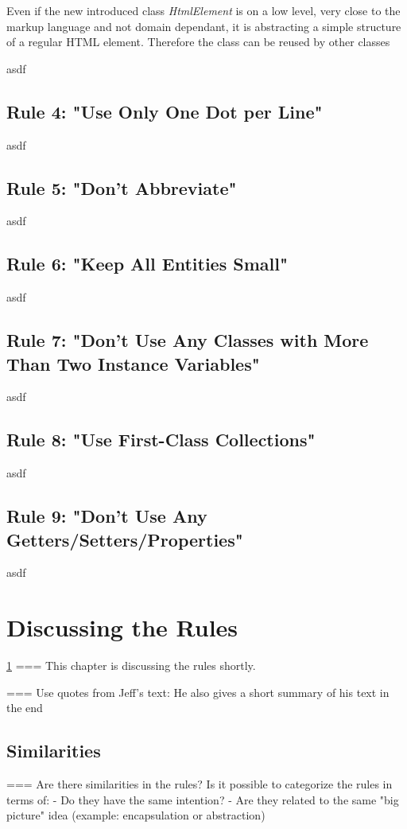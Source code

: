 %
\label{listing:rule1good:element}

Even if the new introduced class \textit{HtmlElement} is on a low level, very close to the markup language and not domain dependant, it is abstracting a simple structure of a regular \acf{HTML} element. Therefore the class can be reused by other classes 




asdf
\subsection{Rule 4: "Use Only One Dot per Line"}
asdf
\subsection{Rule 5: "Don't Abbreviate"}
asdf
\subsection{Rule 6: "Keep All Entities Small"}
asdf
\subsection{Rule 7: "Don’t Use Any Classes with More Than Two Instance Variables"}
asdf
\subsection{Rule 8: "Use First-Class Collections"}
asdf
\subsection{Rule 9: "Don’t Use Any Getters/Setters/Properties"}
asdf
\section{Discussing the Rules}
\label{d:discussion}
\ref{d:discussion}
=== This chapter is discussing the rules shortly. 

=== Use quotes from Jeff's text: He also gives a short summary of his text in the end

\subsection{Similarities}
=== Are there similarities in the rules? Is it possible to categorize the rules in terms of: 
 - Do they have the same intention?
 - Are they related to the same "big picture" idea (example: encapsulation or abstraction) 

